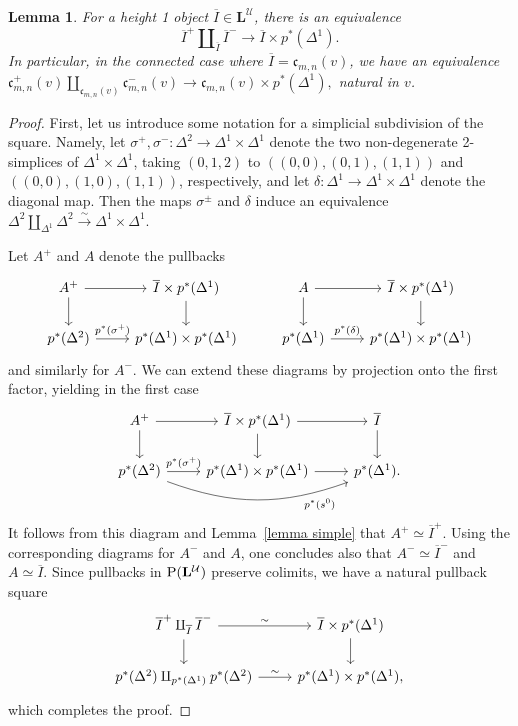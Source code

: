\documentclass{amsart}
\numberwithin{theorem}{subsection}
\newtheorem{lemma}[theorem]{Lemma}
\theoremstyle{definition}
\newcommand{\xU}{\mathcal{U}}
\newcommand{\olI}{\overline{I}}
\newcommand{\xfc}{\mathfrak{c}}
\newcommand{\Pre}{\name{P}}
\newcommand{\isoto}{\xrightarrow{\sim}}
\newcommand{\name}[1]{\ensuremath{\text{\textup{#1}}}}
\newcommand{\levelg}{\mathbf{L}}
\newcommand{\levelU}{\levelg^\xU}
\begin{document}
\begin{lemma}\label{lem decomposing}
	For a height 1 object $\olI \in \levelU$, there is an equivalence
	\[ \olI^+ \amalg_{\olI} \olI^- \to
	\olI \times p^*(\Delta^{1}).\]
	In particular, in the connected case where $\olI= \xfc_{m,n}(v)$, we have an equivalence
	$\xfc_{m,n}^{+} (v)\amalg_{\xfc_{m,n}(v)}
	\xfc_{m,n}^{-} (v) \to \xfc_{m,n}(v) \times
	p^*(\Delta^{1}),$ natural in $v$.
\end{lemma}
\begin{proof}
First, let us introduce some notation for a simplicial subdivision of the square.
Namely, let 
	$\sigma^+, \sigma^- \colon \Delta^{2} \to \Delta^{1} \times \Delta^{1}$ denote the two non-degenerate 2-simplices of $\Delta^{1} \times \Delta^{1}$, taking $(0,1,2)$ to $((0,0), (0,1), (1,1))$ and $((0,0), (1,0), (1,1))$, respectively, and let $\delta \colon \Delta^{1} \to \Delta^{1} \times \Delta^{1}$ denote the diagonal map.
	Then the maps $\sigma^{\pm}$ and $\delta$ induce an equivalence $\Delta^{2} \amalg_{\Delta^{1}} \Delta^{2} \isoto \Delta^{1}\times
	\Delta^{1}$.

	Let $A^+$ and $A$ denote the pullbacks
\[ \begin{tikzcd}
A^+ \rar \dar & \olI \times p^*(\Delta^1) \dar & 
A \rar \dar & \olI \times p^*(\Delta^1) \dar
 \\
p^*(\Delta^2) \rar{p^*(\sigma^+)} & p^*(\Delta^1) \times p^*(\Delta^1) & 
p^*(\Delta^1) \rar{p^*(\delta)} & p^*(\Delta^1) \times p^*(\Delta^1)
\end{tikzcd} \]
and similarly for $A^-$.
We can extend these diagrams by projection onto the first factor, yielding in the first case
\[ \begin{tikzcd}
A^+ \rar \dar & \olI \times p^*(\Delta^1) \dar \rar &  \olI \dar
 \\
p^*(\Delta^2) \rar{p^*(\sigma^+)} \arrow[rr, bend right=20, "p^*(s^0)"' near end] & p^*(\Delta^1) \times p^*(\Delta^1) \rar & p^*(\Delta^1).
\end{tikzcd} \]
It follows from this diagram and Lemma~\ref{lemma simple} that $A^+ \simeq \olI^+$.
Using the corresponding diagrams for $A^-$ and $A$, one concludes also that $A^- \simeq \olI^-$ and $A\simeq \olI$.
Since pullbacks in $\Pre(\levelU)$ preserve colimits, we have a natural pullback square 
\[
\begin{tikzcd}
\olI^+ \amalg_{\olI} \olI^- \rar{\sim} \dar & 
\olI \times p^*(\Delta^1) \dar \\
p^*(\Delta^2) \amalg_{p^*(\Delta^1)} p^*(\Delta^2) \rar{\sim} & 
p^*(\Delta^1) \times p^*(\Delta^1),
\end{tikzcd}
\]
which completes the proof.
\end{proof}
\end{document}
